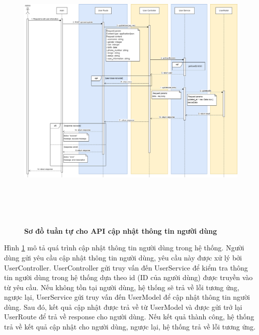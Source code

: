 \begin{figure}[H]
  \centering
  \includegraphics[width=16cm,height=14cm]{Images/sequence_api/editUser.png}
  \caption[Sơ đồ tuần tự cho API cập nhật thông tin người dùng ]{\bfseries \fontsize{12pt}{0pt}
  \selectfont Sơ đồ tuần tự cho API cập nhật thông tin người dùng }
  \label{api_updateUserById} %
\end{figure}
Hình \ref{api_updateUserById} mô tả quá trình cập nhật thông tin người dùng trong hệ thống. Người dùng gửi yêu cầu cập nhật thông tin người dùng, 
yêu cầu này được xử lý bởi UserController. UserController gửi truy vấn đến UserService để kiểm tra thông tin người dùng trong hệ thống dựa theo id (ID của người dùng) được truyền vào từ yêu cầu. 
Nếu không tồn tại người dùng, hệ thống sẽ trả về lỗi tương ứng, ngược lại, UserService gửi truy vấn đến UserModel để cập nhật thông tin người dùng. Sau đó, kết quả cập nhật được trả về 
từ UserModel và được gửi trở lại UserRoute để trả về response cho người dùng. Nếu kết quả thành công, hệ thống trả về kết quả cập nhật cho người dùng, ngược lại, hệ thống trả về lỗi tương ứng.
